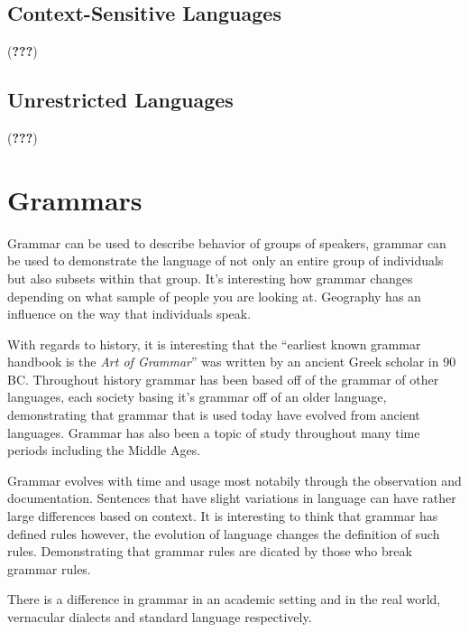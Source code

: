 \documentclass{article}
\begin{document}
\subsection{Context-Sensitive Languages} (\textbf{???})

\subsection{Unrestricted Languages} (\textbf{???})

\section{Grammars}

\medskip

Grammar can be used to describe behavior of groups of speakers, grammar can be used to demonstrate the language of not only an
entire group of individuals but also subsets within that group. It's interesting how grammar changes depending on what sample 
of people you are looking at. Geography has an influence on the way that individuals speak.

With regards to history, it is interesting that the ``earliest known grammar handbook is the \textit{Art of Grammar}'' was written
by an ancient Greek scholar in 90 BC. Throughout history grammar has been based off of the grammar of other languages, each society
basing it's grammar off of an older language, demonstrating that grammar that is used today have evolved from ancient languages.
Grammar has also been a topic of study throughout many time periods including the Middle Ages.

Grammar evolves with time and usage most notabily through the observation and documentation. Sentences that have slight variations in
language can have rather large differences based on context. It is interesting to think that grammar has defined rules however, the 
evolution of language changes the definition of such rules. Demonstrating that grammar rules are dicated by those who break grammar 
rules. 

There is a difference in grammar in an academic setting and in the real world, vernacular dialects and standard language respectively.
\end{document}

